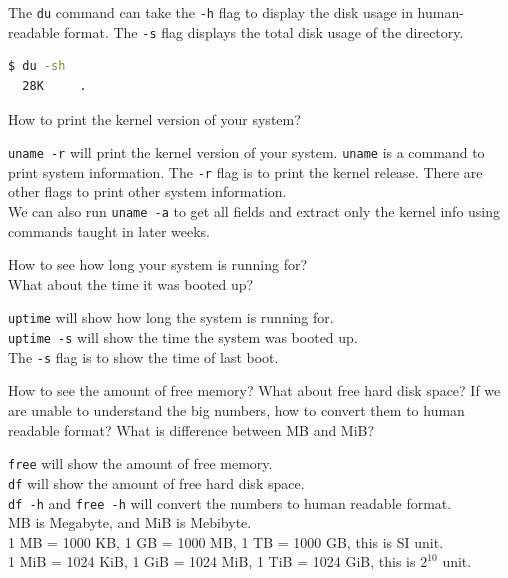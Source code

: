 The \texttt{du} command can take the \texttt{-h} flag to display the disk usage in human-readable format.
The \texttt{-s} flag displays the total disk usage of the directory.

\begin{lstlisting}[language=bash]
  $ du -sh
  28K     .
\end{lstlisting}


\begin{qs}
  How to print the kernel version of your system?
\end{qs}

\begin{ans}
  \texttt{uname -r} will print the kernel version of your system.
  \texttt{uname} is a command to print system information.
  The \texttt{-r} flag is to print the kernel release.
  There are other flags to print other system information. \\
  We can also run \texttt{uname -a} to get all fields and extract only the
  kernel info using commands taught in later weeks.
\end{ans}

\begin{qs}
  How to see how long your system is running for? \\
  What about the time it was booted up?
\end{qs}

\begin{ans}
  \texttt{uptime} will show how long the system is running for.\\
  \texttt{uptime -s} will show the time the system was booted up. \\
  The \texttt{-s} flag is to show the time of last boot.
\end{ans}

\begin{qs}
  How to see the amount of free memory? What about free hard disk space?
  If we are unable to understand the big numbers, how to convert them to human readable format?
  What is difference between MB and MiB?
\end{qs}

\begin{ans}
  \texttt{free} will show the amount of free memory. \\
  \texttt{df} will show the amount of free hard disk space. \\
  \texttt{df -h} and \texttt{free -h}
  will convert the numbers to human readable format. \\
  MB is Megabyte, and MiB is Mebibyte. \\
  1 MB = 1000 KB, 1 GB = 1000 MB, 1 TB = 1000 GB, this is SI unit. \\
  1 MiB = 1024 KiB, 1 GiB = 1024 MiB, 1 TiB = 1024 GiB, this is $2^{10}$ unit.
\end{ans}

